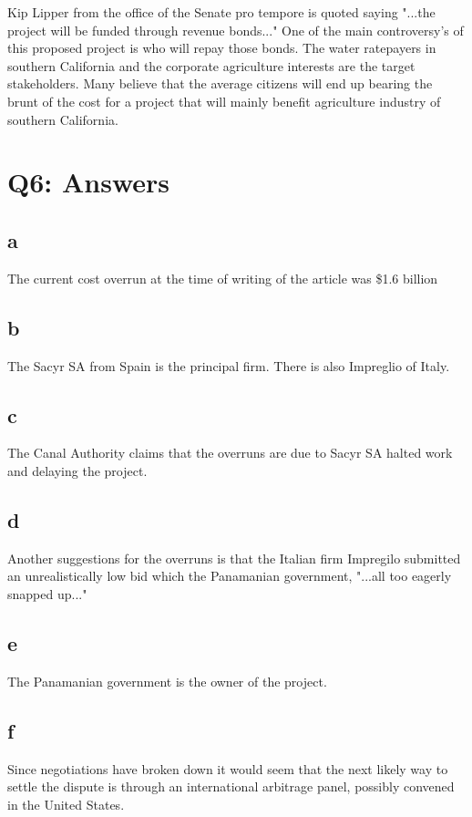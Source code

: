 \documentclass[12pt]{article} %
\begin{document}
			Kip Lipper from the office of the Senate pro tempore is quoted saying "...the project will be funded through revenue bonds..." One of the main controversy's of this proposed project is who will repay those bonds. The water ratepayers in southern California and the corporate agriculture interests are the target stakeholders. Many believe that the average citizens will end up bearing the brunt of the cost for a project that will mainly benefit agriculture industry of southern California.
\section{Q6: Answers}

	\subsection{a}
		The current cost overrun at the time of writing of the article was \$1.6 billion 
		
	\subsection{b}
		The Sacyr SA from Spain is the principal firm. There is also Impreglio of Italy.
		
	\subsection{c}
		The Canal Authority claims that the overruns are due to Sacyr SA halted work and delaying the project.
		
	\subsection{d}
		Another suggestions for the overruns is that the Italian firm Impregilo submitted an unrealistically low bid which the Panamanian government, "...all too eagerly snapped up..."
		
	\subsection{e}
		The Panamanian government is the owner of the project.
		
	\subsection{f}
		Since negotiations have broken down it would seem that the next likely way to settle the dispute is through an international arbitrage panel, possibly convened in the United States.
		
\end{document}
